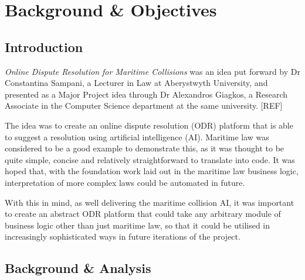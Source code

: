 \chapter{Background \& Objectives}


\section{Introduction} %

\emph{Online Dispute Resolution for Maritime Collisions} was an idea put forward by Dr Constantina Sampani, a Lecturer in Law at Aberystwyth University, and presented as a Major Project idea through Dr Alexandros Giagkos, a Research Associate in the Computer Science department at the same university. [REF] %

The idea was to create an online dispute resolution (ODR) platform that is able to suggest a resolution using artificial intelligence (AI). Maritime law was considered to be a good example to demonstrate this, as it was thought to be quite simple, concise and relatively straightforward to translate into code. It was hoped that, with the foundation work laid out in the maritime law business logic, interpretation of more complex laws could be automated in future.

With this in mind, as well delivering the maritime collision AI, it was important to create an abstract ODR platform that could take any arbitrary module of business logic other than just maritime law, so that it could be utilised in increasingly sophisticated ways in future iterations of the project.

\section{Background \& Analysis} %

